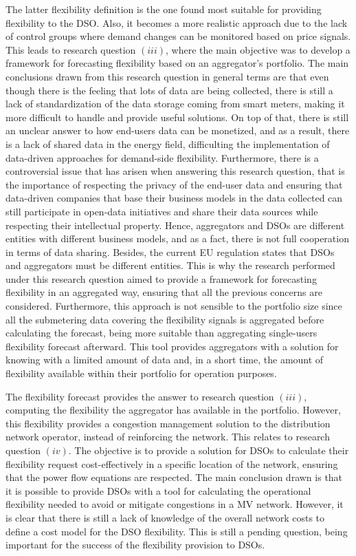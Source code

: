 The latter flexibility definition is the one found most suitable for providing flexibility to the DSO. Also, it becomes a more realistic approach due to the lack of control groups where demand changes can be monitored based on price signals. This leads to research question $(iii)$, where the main objective was to develop a framework for forecasting flexibility based on an aggregator's portfolio. The main conclusions drawn from this research question in general terms are that even though there is the feeling that lots of data are being collected, there is still a lack of standardization of the data storage coming from smart meters, making it more difficult to handle and provide useful solutions. On top of that, there is still an unclear answer to how end-users data can be monetized, and as a result, there is a lack of shared data in the energy field, difficulting the implementation of data-driven approaches for demand-side flexibility. Furthermore, there is a controversial issue that has arisen when answering this research question, that is the importance of respecting the privacy of the end-user data and ensuring that data-driven companies that base their business models in the data collected can still participate in open-data initiatives and share their data sources while respecting their intellectual property. Hence, aggregators and DSOs are different entities with different business models, and as a fact, there is not full cooperation in terms of data sharing. Besides, the current EU regulation states that DSOs and aggregators must be different entities. This is why the research performed under this research question aimed to provide a framework for forecasting flexibility in an aggregated way, ensuring that all the previous concerns are considered. Furthermore, this approach is not sensible to the portfolio size since all the submetering data covering the flexibility signals is aggregated before calculating the forecast, being more suitable than aggregating single-users flexibility forecast afterward. This tool provides aggregators with a solution for knowing with a limited amount of data and, in a short time, the amount of flexibility available within their portfolio for operation purposes. 

The flexibility forecast provides the answer to research question $(iii)$, computing the flexibility the aggregator has available in the portfolio. However, this flexibility provides a congestion management solution to the distribution network operator, instead of reinforcing the network. This relates to research question $(iv)$. The objective is to provide a solution for DSOs to calculate their flexibility request cost-effectively in a specific location of the network, ensuring that the power flow equations are respected. The main conclusion drawn is that it is possible to provide DSOs with a tool for calculating the operational flexibility needed to avoid or mitigate congestions in a MV network. However, it is clear that there is still a lack of knowledge of the overall network costs to define a cost model for the DSO flexibility. This is still a pending question, being important for the success of the flexibility provision to DSOs. 

